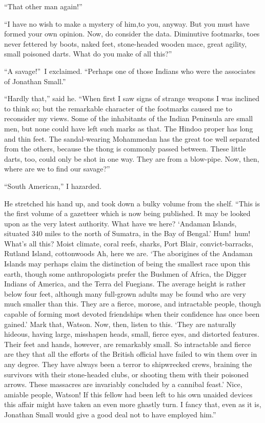 \documentclass[12pt,english,oneside]{book}
\begin{document}
{}``That other man again!''

{}``I have no wish to make a mystery of him,\mdsh{---}to you, anyway.
But you must have formed your own opinion. Now, do consider the data.
Diminutive footmarks, toes never fettered by boots, naked feet, stone-headed
wooden mace, great agility, small poisoned darts. What do you make
of all this?''

{}``A savage!''\ I exclaimed. {}``Perhaps one of those Indians
who were the associates of Jonathan Small.''

{}``Hardly that,'' said he. {}``When first I saw signs of strange
weapons I was inclined to think so; but the remarkable character of
the footmarks caused me to reconsider my views. Some of the inhabitants
of the Indian Peninsula are small men, but none could have left such
marks as that. The Hindoo proper has long and thin feet. The sandal-wearing
Mohammedan has the great toe well separated from the others, because
the thong is commonly passed between. These little darts, too, could
only be shot in one way. They are from a blow-pipe. Now, then, where
are we to find our savage?''

{}``South American,'' I hazarded.

He stretched his hand up, and took down a bulky volume from the shelf.
{}``This is the first volume of a gazetteer which is now being published.
It may be looked upon as the very latest authority. What have we here?
`Andaman Islands, situated 340 miles to the north of Sumatra, in the
Bay of Bengal.' Hum!\ hum! What's all this? Moist climate, coral
reefs, sharks, Port Blair, convict-barracks, Rutland Island, cottonwoods\mdsh{---}
Ah, here we are. `The aborigines of the Andaman Islands may perhaps
claim the distinction of being the smallest race upon this earth,
though some anthropologists prefer the Bushmen of Africa, the Digger
Indians of America, and the Terra del Fuegians. The average height
is rather below four feet, although many full-grown adults may be
found who are very much smaller than this. They are a fierce, morose,
and intractable people, though capable of forming most devoted friendships
when their confidence has once been gained.' Mark that, Watson. Now,
then, listen to this. `They are naturally hideous, having large, misshapen
heads, small, fierce eyes, and distorted features. Their feet and
hands, however, are remarkably small. So intractable and fierce are
they that all the efforts of the British official have failed to win
them over in any degree. They have always been a terror to shipwrecked
crews, braining the survivors with their stone-headed clubs, or shooting
them with their poisoned arrows. These massacres are invariably concluded
by a cannibal feast.' Nice, amiable people, Watson! If this fellow
had been left to his own unaided devices this affair might have taken
an even more ghastly turn. I fancy that, even as it is, Jonathan Small
would give a good deal not to have employed him.''
\end{document}
